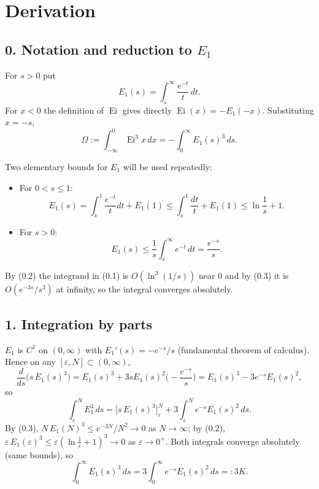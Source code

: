 \documentclass[11pt]{article}
\theoremstyle{remark}
\begin{document}
\section*{Derivation}

\subsection*{0. Notation and reduction to $E_1$}

For $s>0$ put
$$E_1(s)=\int_{s}^{\infty}\frac{e^{-t}}{t}\,dt .$$
For $x<0$ the definition of $\operatorname{Ei}$ gives directly $\operatorname{Ei}(x)=-E_1(-x)$. Substituting $x=-s$,
\begin{equation}\Omega:=\int_{-\infty}^{0}\operatorname{Ei}^{3}x\,dx=-\int_{0}^{\infty}E_1(s)^{3}\,ds .
\tag{0.1}\end{equation}

Two elementary bounds for $E_1$ will be used repeatedly:

\begin{itemize}
\item For $0<s\le 1$:
 \begin{equation}E_1(s)=\int_s^1\frac{e^{-t}}{t}dt+E_1(1)\le\int_s^1\frac{dt}{t}+E_1(1)\le \ln\frac1s+1 .
 \tag{0.2}\end{equation}
\item For $s>0$:
 \begin{equation}E_1(s)\le\frac1s\int_s^\infty e^{-t}\,dt=\frac{e^{-s}}{s}.
 \tag{0.3}\end{equation}
\end{itemize}

By (0.2) the integrand in (0.1) is $O(\ln^3(1/s))$ near $0$ and by (0.3) it is $O(e^{-3s}/s^3)$ at infinity, so the integral converges absolutely.

\subsection*{1. Integration by parts}

$E_1$ is $C^1$ on $(0,\infty)$ with $E_1'(s)=-e^{-s}/s$ (fundamental theorem of calculus). Hence on any $[\varepsilon,N]\subset(0,\infty)$,
$$\frac{d}{ds}\big(s\,E_1(s)^3\big)=E_1(s)^3+3sE_1(s)^2\Big(-\frac{e^{-s}}{s}\Big)
=E_1(s)^3-3e^{-s}E_1(s)^2 ,$$
so
$$\int_{\varepsilon}^{N}E_1^{3}\,ds=\Big[s\,E_1(s)^{3}\Big]_{\varepsilon}^{N}
+3\int_{\varepsilon}^{N}e^{-s}E_1(s)^{2}\,ds .$$
By (0.3), $N\,E_1(N)^3\le e^{-3N}/N^{2}\to0$ as $N\to\infty$; by (0.2), $\varepsilon\,E_1(\varepsilon)^3\le\varepsilon(\ln\frac1\varepsilon+1)^3\to0$ as $\varepsilon\to0^+$. Both integrals converge absolutely (same bounds), so
\begin{equation}\int_{0}^{\infty}E_1(s)^{3}\,ds=3\int_{0}^{\infty}e^{-s}E_1(s)^{2}\,ds=:3K .
\tag{1.1}\end{equation}
\end{document}
